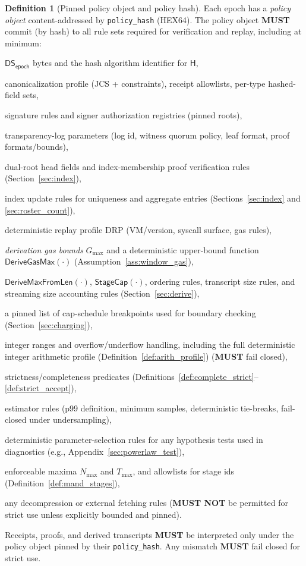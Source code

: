 \documentclass[11pt]{article}
\newcommand{\MUST}{\textbf{MUST}}
\newcommand{\MUSTNOT}{\textbf{MUST NOT}}
\newcommand{\code}[1]{\texttt{#1}}
\newcommand{\term}[1]{\emph{#1}}
\newcommand{\1}{\mathbf{1}}
\newcommand{\Hash}{\mathsf{H}}
\newcommand{\DS}{\mathsf{DS}}
\theoremstyle{definition}
\newtheorem{definition}{Definition}
\theoremstyle{plain}
\begin{document}
\begin{definition}[Pinned policy object and policy hash]
\label{def:policy_object}
Each epoch has a \term{policy object} content-addressed by \code{policy\_hash} (HEX64). The policy object \MUST{} commit (by hash) to all rule sets required for verification and replay, including at minimum:
\begin{tightitemize}
\item $\DS_{\textsf{epoch}}$ bytes and the hash algorithm identifier for $\Hash$,
\item canonicalization profile (JCS + constraints), receipt allowlists, per-type hashed-field sets,
\item signature rules and signer authorization registries (pinned roots),
\item transparency-log parameters (log id, witness quorum policy, leaf format, proof formats/bounds),
\item dual-root head fields and index-membership proof verification rules (Section~\ref{sec:index}),
\item index update rules for uniqueness and aggregate entries (Sections~\ref{sec:index} and \ref{sec:roster_count}),
\item deterministic replay profile \textsf{DRP} (VM/version, syscall surface, gas rules),
\item \emph{derivation gas bounds} $G_{\max}$ and a deterministic upper-bound function $\mathsf{DeriveGasMax}(\cdot)$ (Assumption~\ref{ass:window_gas}),
\item $\mathsf{DeriveMaxFromLen}(\cdot)$, $\mathsf{StageCap}(\cdot)$, ordering rules, transcript size rules, and streaming size accounting rules (Section~\ref{sec:derive}),
\item a pinned list of cap-schedule breakpoints used for boundary checking (Section~\ref{sec:charging}),
\item integer ranges and overflow/underflow handling, including the full deterministic integer arithmetic profile (Definition~\ref{def:arith_profile}) (\MUST{} fail closed),
\item strictness/completeness predicates (Definitions~\ref{def:complete_strict}--\ref{def:strict_accept}),
\item estimator rules (p99 definition, minimum samples, deterministic tie-breaks, fail-closed under undersampling),
\item deterministic parameter-selection rules for any hypothesis tests used in diagnostics (e.g., Appendix~\ref{sec:powerlaw_test}),
\item enforceable maxima $N_{\max}$ and $T_{\max}$, and allowlists for stage ids (Definition~\ref{def:mand_stages}),
\item any decompression or external fetching rules (\MUSTNOT{} be permitted for strict use unless explicitly bounded and pinned).
\end{tightitemize}
Receipts, proofs, and derived transcripts \MUST{} be interpreted only under the policy object pinned by their \code{policy\_hash}. Any mismatch \MUST{} fail closed for strict use.
\end{definition}
\end{document}
